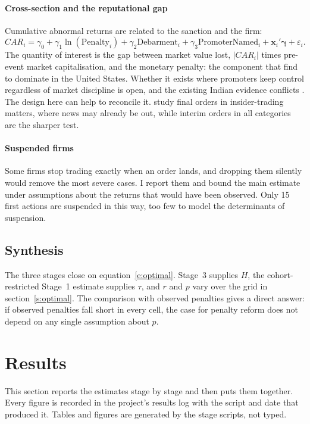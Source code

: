 \documentclass[letterpaper,11pt,leqno]{article}
\begin{document}
\paragraph{Cross-section and the reputational gap} Cumulative abnormal returns are related to the sanction and the firm:
\begin{equation}
CAR_i = \gamma_0 + \gamma_1 \ln(\text{Penalty}_i) + \gamma_2 \text{Debarment}_i + \gamma_3 \text{PromoterNamed}_i + \bm{x}_i'\bm{\gamma} + \varepsilon_i.
\label{e:cross}\end{equation}
The quantity of interest is the gap between market value lost, $|CAR_i|$ times pre-event market capitalisation, and the monetary penalty: the component that \citet{KLM08} find to dominate in the United States. Whether it exists where promoters keep control regardless of market discipline is open, and the existing Indian evidence conflicts \citep{J22,GPS26}. The design here can help to reconcile it. \citet{GPS26} study final orders in insider-trading matters, where news may already be out, while interim orders in all categories are the sharper test.

\paragraph{Suspended firms} Some firms stop trading exactly when an order lands, and dropping them silently would remove the most severe cases. I report them and bound the main estimate under assumptions about the returns that would have been observed. Only 15 first actions are suspended in this way, too few to model the determinants of suspension.

\subsection{Synthesis}

The three stages close on equation~\eqref{e:optimal}. Stage~3 supplies $H$, the cohort-restricted Stage~1 estimate supplies $\tau$, and $r$ and $p$ vary over the grid in section~\ref{s:optimal}. The comparison with observed penalties gives a direct answer: if observed penalties fall short in every cell, the case for penalty reform does not depend on any single assumption about $p$.

\section{Results}\label{s:results}

This section reports the estimates stage by stage and then puts them together. Every figure is recorded in the project's results log with the script and date that produced it. Tables and figures are generated by the stage scripts, not typed.
\end{document}
